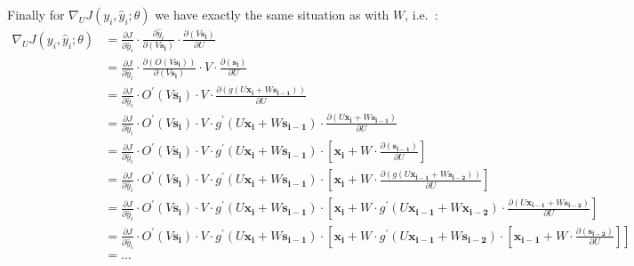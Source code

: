 Finally for $\nabla_U J(y_i, \hat{y}_i ; \theta)$ we have exactly the same situation as with $W$, i.e.\ :
\begingroup
\allowdisplaybreaks
{\setlength{\jot}{5pt}
\begin{align*}
\nabla_U J(y_i, \hat{y}_i ; \theta)& = \frac{\partial J}{\partial \hat{y}_i}
\cdot \frac{\partial \hat{y}_i}{\partial (V \boldsymbol{s_i})} \cdot \frac{\partial (V \boldsymbol{s_i})}{\partial U} \\
&= \frac{\partial J}{\partial \hat{y}_i} \cdot \frac{ \partial ( O(V\boldsymbol{s_i}))}{\partial (V\boldsymbol{s_i})}
\cdot V \cdot \frac{\partial (\boldsymbol{s_i})}{\partial U} \\
&= \frac{\partial J}{\partial \hat{y}_i} \cdot O^\prime(V \boldsymbol{s_i}) \cdot V
\cdot \frac{\partial (g(U \boldsymbol{x_i} + W \boldsymbol{s_{i-1}}))} {\partial U} \\
&= \frac{\partial J}{\partial \hat{y}_i} \cdot O^\prime(V \boldsymbol{s_i}) \cdot V
\cdot g^\prime(U \boldsymbol{x_i} + W \boldsymbol{s_{i-1}})
\cdot \frac{\partial (U \boldsymbol{x_i} + W \boldsymbol{s_{i-1}})} {\partial U} \\
& = \frac{\partial J}{\partial \hat{y}_i} \cdot O^\prime(V \boldsymbol{s_i}) \cdot V \cdot g^\prime(U \boldsymbol{x_i}
+ W \boldsymbol{s_{i-1}}) \cdot \left[\boldsymbol{x_{i}}
+ W \cdot \frac{\partial(\boldsymbol{s_{i-1}})} {\partial U} \right] \\
& = \frac{\partial J}{\partial \hat{y}_i} \cdot O^\prime(V \boldsymbol{s_i}) \cdot V \cdot g^\prime(U \boldsymbol{x_i}
+ W \boldsymbol{s_{i-1}}) \cdot \left[\boldsymbol{x_{i}} + W \cdot \frac{\partial (g(U\boldsymbol{x_{i-1}}
+ W \boldsymbol{s_{i-2}}))} {\partial U}\right] \\
& = \frac{\partial J}{\partial \hat{y}_i} \cdot O^\prime(V\boldsymbol{s_i}) \cdot V \cdot g^\prime(U\boldsymbol{x_i}
+ W \boldsymbol{s_{i-1}}) \cdot \left[\boldsymbol{x_{i}} + W \cdot g^\prime (U\boldsymbol{x_{i-1}}
+ W \boldsymbol{x_{i-2}}) \cdot \frac{\partial(U \boldsymbol{x_{i-1}} + W\boldsymbol{s_{i-2}})} {\partial U} \right] \\
&= \frac{\partial J}{\partial \hat{y}_i} \cdot O^\prime(V\boldsymbol{s_i}) \cdot V \cdot g^\prime(U\boldsymbol{x_i}
+ W \boldsymbol{s_{i-1}}) \cdot \left[\boldsymbol{x_{i}} + W \cdot g^\prime (U\boldsymbol{x_{i-1}}
+ W \boldsymbol{s_{i-2}}) \cdot \left[\boldsymbol{x_{i-1}}
+ W \cdot \frac{\partial(\boldsymbol{s_{i-2}})} {\partial U} \right] \right] \\
& = \ldots
\end{align*}}
\endgroup

